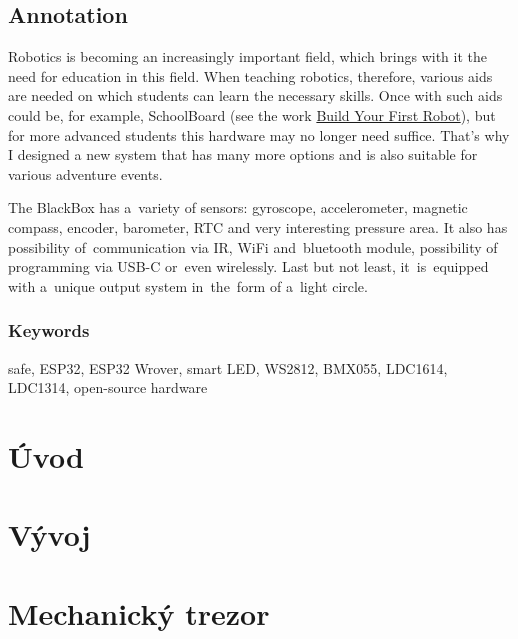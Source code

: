 \documentclass{template/socthesis}
\newcommand{\chapterm}[1]{
    
    \chapter{#1}

    \vspace{-10mm}
}
\begin{document}
\section*{Annotation}
\color{black}

Robotics is becoming an increasingly important field, which brings with it the need for education in this field.
When teaching robotics, therefore, various aids are needed on which students can learn the necessary skills. Once with such aids
could be, for example, SchoolBoard (see the work \href{https://github.com/TVavrinec/SOC-text/blob/master/SOC.pdf}{Build Your First Robot}), but for more advanced students this hardware may no 
longer need suffice. That's why I designed a new system that has many more options and is also suitable for various adventure events. 

The BlackBox has a~variety of sensors: 
gyroscope, accelerometer, magnetic compass, encoder, barometer, RTC and very interesting pressure area. It also has
possibility of~communication via IR, WiFi and~bluetooth module, possibility of programming via USB-C or~even wirelessly.
Last but not least, it~is~equipped with a~unique output system in~the~form of a~light circle.

\subsection*{Keywords}
\color{black}
safe, ESP32, ESP32 Wrover, smart LED, WS2812, BMX055, LDC1614, \\ LDC1314, open-source hardware

\newpage
\pagestyle{plain}

\tableofcontents

\setcounter{figure}{0}
\setcounter{table}{0}
\newpage

\chapterm{Úvod}


\chapterm{Vývoj}
\label{E-vyvoj}






%
%
%
%

\chapterm{Mechanický trezor} 
\label{M3}


%
%
\end{document}
